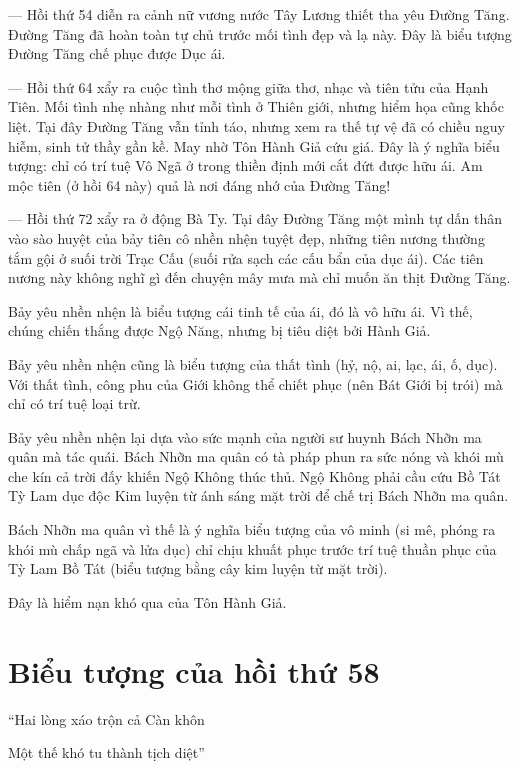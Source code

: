 — Hồi thứ 54 diễn ra cảnh nữ vương nước Tây Lương thiết tha yêu Đường Tăng. Đường Tăng đã hoàn toàn tự chủ trước mối tình đẹp và lạ này. Đây là biểu tượng Đường Tăng chế phục được Dục ái.

— Hồi thứ 64 xẩy ra cuộc tình thơ mộng giữa thơ, nhạc và tiên tửu của Hạnh Tiên. Mối tình nhẹ nhàng như mỗi tình ở Thiên giới, nhưng hiểm họa cũng khốc liệt. Tại đây Đường Tăng vẫn tỉnh táo, nhưng xem ra thế tự vệ đã có chiều nguy hiễm, sinh tử thầy gần kề. May nhờ Tôn Hành Giả cứu giá. Đây là ý nghĩa biểu tượng: chỉ có trí tuệ Vô Ngã ở trong thiền định mới cắt đứt được hữu ái. Am mộc tiên (ở hồi 64 này) quả là nơi đáng nhớ của Đường Tăng!

— Hồi thứ 72 xẩy ra ở động Bà Ty. Tại đây Đường Tăng một mình tự dấn thân vào sào huyệt của bảy tiên cô nhền nhện tuyệt đẹp, những tiên nương thường tắm gội ở suối trời Trạc Cấu (suối rửa sạch các cấu bẩn của dục ái). Các tiên nương này không nghĩ gì đến chuyện mây mưa mà chỉ muốn ăn thịt Đường Tăng.

Bảy yêu nhền nhện là biểu tượng cái tinh tế của ái, đó là vô hữu ái. Vì thế, chúng chiến thắng được Ngộ Năng, nhưng bị tiêu diệt bởi Hành Giả.

Bảy yêu nhền nhện cũng là biểu tượng của thất tình (hỷ, nộ, ai, lạc, ái, ố, dục). Với thất tình, công phu của Giới không thể chiết phục (nên Bát Giới bị trói) mà chỉ có trí tuệ loại trừ.

Bảy yêu nhền nhện lại dựa vào sức mạnh của người sư huynh Bách Nhỡn ma quân mà tác quái. Bách Nhỡn ma quân có tà pháp phun ra sức nóng và khói mù che kín cả trời đấy khiến Ngộ Không thúc thủ. Ngộ Không phải cầu cứu Bồ Tát Tỳ Lam dục độc Kim luyện từ ánh sáng mặt trời để chế trị Bách Nhỡn ma quân.

Bách Nhỡn ma quân vì thế là ý nghĩa biểu tượng của vô minh (si mê, phóng ra khói mù chấp ngã và lửa dục) chỉ chịu khuất phục trước trí tuệ thuần phục của Tỳ Lam Bồ Tát (biểu tượng bằng cây kim luyện từ mặt trời).

Đây là hiểm nạn khó qua của Tôn Hành Giả.

\section{Biểu tượng của hồi thứ 58} %
\label{sec:bieu_tuong_hoi_58}

\begin{itshape}
``Hai lòng xáo trộn cả Càn khôn

Một thế khó tu thành tịch diệt''
\end{itshape}

